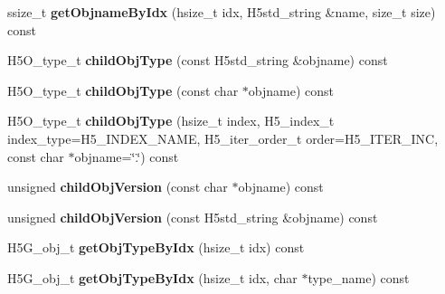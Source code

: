 \begin{DoxyCompactItemize}
\item 
\mbox{\label{class_h5_1_1_h5_location_a3b6afb6ee63f0d6b1587ecdc28828b42}} 
ssize\+\_\+t {\bfseries get\+Objname\+By\+Idx} (hsize\+\_\+t idx, H5std\+\_\+string \&name, size\+\_\+t size) const
\item 
\mbox{\label{class_h5_1_1_h5_location_a2c0eec3da0e8ac483d7f1acf017459f4}} 
H5\+O\+\_\+type\+\_\+t {\bfseries child\+Obj\+Type} (const H5std\+\_\+string \&objname) const
\item 
\mbox{\label{class_h5_1_1_h5_location_a17dda29427ad529b34b8c6315e04f070}} 
H5\+O\+\_\+type\+\_\+t {\bfseries child\+Obj\+Type} (const char $\ast$objname) const
\item 
\mbox{\label{class_h5_1_1_h5_location_a557965418005dd9250c1b92c6580b2ac}} 
H5\+O\+\_\+type\+\_\+t {\bfseries child\+Obj\+Type} (hsize\+\_\+t index, H5\+\_\+index\+\_\+t index\+\_\+type=H5\+\_\+\+I\+N\+D\+E\+X\+\_\+\+N\+A\+ME, H5\+\_\+iter\+\_\+order\+\_\+t order=H5\+\_\+\+I\+T\+E\+R\+\_\+\+I\+NC, const char $\ast$objname=\char`\"{}.\char`\"{}) const
\item 
\mbox{\label{class_h5_1_1_h5_location_a2c7da824f93a5acaab0b36b66e0cbdba}} 
unsigned {\bfseries child\+Obj\+Version} (const char $\ast$objname) const
\item 
\mbox{\label{class_h5_1_1_h5_location_aa09c5a22b0a7c73b6422294e23faf9c0}} 
unsigned {\bfseries child\+Obj\+Version} (const H5std\+\_\+string \&objname) const
\item 
\mbox{\label{class_h5_1_1_h5_location_aca50c2206092b64b6cd9ca884e62f765}} 
H5\+G\+\_\+obj\+\_\+t {\bfseries get\+Obj\+Type\+By\+Idx} (hsize\+\_\+t idx) const
\item 
\mbox{\label{class_h5_1_1_h5_location_a03a0c4d7a21c368d236abbc76d62cec0}} 
H5\+G\+\_\+obj\+\_\+t {\bfseries get\+Obj\+Type\+By\+Idx} (hsize\+\_\+t idx, char $\ast$type\+\_\+name) const
\item 
\mbox{\label{class_h5_1_1_h5_location_a582e4b776b97837f864d158a68c31164}} 

\end{DoxyCompactItemize}
